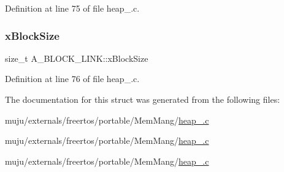Definition at line 75 of file heap\+\_.\+c.

\mbox{\label{struct_a___b_l_o_c_k___l_i_n_k_ad5dcf5df03d8be6186c567be9e2c657b}} 
\subsubsection{\texorpdfstring{x\+Block\+Size}{xBlockSize}}
{\footnotesize\ttfamily size\+\_\+t A\+\_\+\+B\+L\+O\+C\+K\+\_\+\+L\+I\+N\+K\+::x\+Block\+Size}



Definition at line 76 of file heap\+\_.\+c.



The documentation for this struct was generated from the following files\+:\begin{DoxyCompactItemize}
\item 
muju/externals/freertos/portable/\+Mem\+Mang/\hyperlink{externals_2freertos_2portable_2_mem_mang_2heap__2_8c}{heap\+\_.\+c}\item 
muju/externals/freertos/portable/\+Mem\+Mang/\hyperlink{externals_2freertos_2portable_2_mem_mang_2heap__4_8c}{heap\+\_.\+c}\item 
muju/externals/freertos/portable/\+Mem\+Mang/\hyperlink{externals_2freertos_2portable_2_mem_mang_2heap__5_8c}{heap\+\_.\+c}\end{DoxyCompactItemize}

